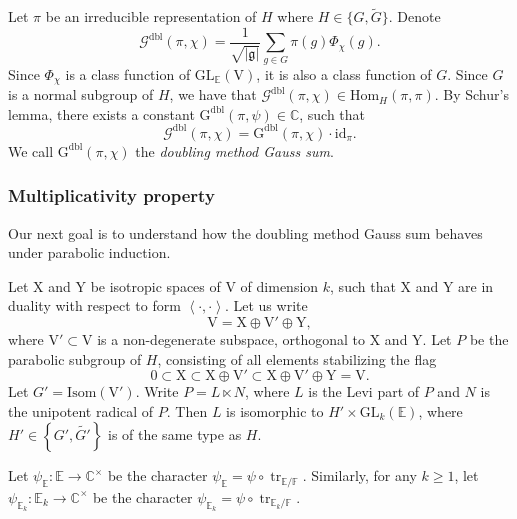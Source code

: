 \documentclass[12pt, reqno]{amsart}
\theoremstyle{definition}
\theoremstyle{definition}
\theoremstyle{definition}
\newcommand{\cComplex}{\mathbb{C}}
\newcommand{\multiplicativegroup}[1]{#1^{\times}}
\newcommand{\Hom}{\mathrm{Hom}}
\newcommand{\idmap}{\mathrm{id}}
\newcommand{\sizeof}[1]{\left|#1\right|}
\newcommand{\hermitianSpace}{\mathrm{V}}
\newcommand{\xIsotropic}{\mathrm{X}}
\newcommand{\yIsotropic}{\mathrm{Y}}
\newcommand{\innerproduct}[2]{\left\langle #1,#2\right\rangle}
\newcommand{\fieldCharacter}{\psi}
\newcommand{\trace}{\operatorname{tr}}
\newcommand{\GL}{\mathrm{GL}}
\newcommand{\GroupExtension}[1]{\widetilde{#1}}
\newcommand{\finiteField}{\mathbb{F}}
\newcommand{\quadraticExtension}{\mathbb{E}}
\newcommand{\quadraticFieldExtension}[1]{\quadraticExtension_{#1}}
\newcommand{\dblGaussSum}[2]{\mathcal{G}^{\mathrm{dbl}}\left(#1, #2\right)}
\newcommand{\dblGaussSumScalar}[2]{\mathrm{G}^{\mathrm{dbl}}\left(#1, #2\right)}
\newcommand{\IsometryGroup}{\mathrm{Isom}}
\newcommand{\lieAlgebra}{\mathfrak{g}}
\begin{document}
Let $\pi$ be an irreducible representation of $H$ where $H \in \{G, \GroupExtension{G}\}$. Denote $$\dblGaussSum{\pi}{\chi} = \frac{1}{\sqrt{\sizeof{\lieAlgebra}}} \sum_{g \in G} \pi\left(g\right) \Phi_{\chi}\left(g\right).$$
Since $\Phi_{\chi}$ is a class function of $\GL_{\quadraticExtension}\left(\hermitianSpace\right)$, it is also a class function of $G$. Since $G$ is a normal subgroup of $H$, we have that $\dblGaussSum{\pi}{\chi} \in \Hom_{H}\left(\pi, \pi\right)$. By Schur's lemma, there exists a constant $\dblGaussSumScalar{\pi}{\fieldCharacter} \in \cComplex$, such that $$\dblGaussSum{\pi}{\chi} = \dblGaussSumScalar{\pi}{\chi} \cdot \idmap_\pi.$$
We call $\dblGaussSumScalar{\pi}{\chi}$ the \emph{doubling method Gauss sum}.

\subsubsection{Multiplicativity property}
Our next goal is to understand how the doubling method Gauss sum behaves under parabolic induction.

Let $\xIsotropic$ and $\yIsotropic$ be isotropic spaces of $\hermitianSpace$ of dimension $k$, such that $\xIsotropic$ and $\yIsotropic$ are in duality with respect to form $\innerproduct{\cdot}{\cdot}$. Let us write $$\hermitianSpace = \xIsotropic \oplus \hermitianSpace' \oplus \yIsotropic,$$
where $\hermitianSpace' \subset \hermitianSpace$ is a non-degenerate subspace, orthogonal to $\xIsotropic$ and $\yIsotropic$. Let $P$ be the parabolic subgroup of $H$, consisting of all elements stabilizing the flag $$0 \subset \xIsotropic \subset \xIsotropic \oplus \hermitianSpace' \subset \xIsotropic \oplus \hermitianSpace' \oplus \yIsotropic = \hermitianSpace.$$
Let $G' = \IsometryGroup\left(\hermitianSpace'\right)$. Write $P = L \ltimes N$, where $L$ is the Levi part of $P$ and $N$ is the unipotent radical of $P$. Then $L$ is isomorphic to $H' \times \GL_k\left(\quadraticExtension\right)$, where $H' \in \left\{G',\GroupExtension{G'}\right\}$ is of the same type as $H$. 

Let $\fieldCharacter_{\quadraticExtension} \colon \quadraticExtension \to \multiplicativegroup{\cComplex}$ be the character  $\fieldCharacter_{\quadraticExtension} = \fieldCharacter \circ \trace_{\quadraticExtension \slash \finiteField}$. Similarly, for any $k \ge 1$, let $\fieldCharacter_{\quadraticFieldExtension{k}} \colon \quadraticFieldExtension{k} \to \multiplicativegroup{\cComplex}$ be the character $\fieldCharacter_{\quadraticFieldExtension{k}} = \fieldCharacter \circ \trace_{\quadraticFieldExtension{k} \slash \finiteField}$.
\end{document}
